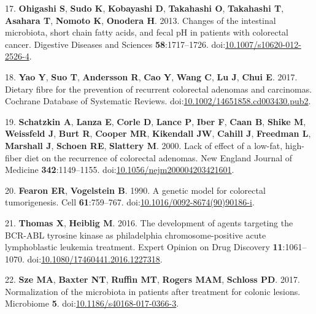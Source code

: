 \documentclass[11pt,]{article}
\begin{document}
\hypertarget{ref-Ohigashi2013}{}
17. \textbf{Ohigashi S}, \textbf{Sudo K}, \textbf{Kobayashi D},
\textbf{Takahashi O}, \textbf{Takahashi T}, \textbf{Asahara T},
\textbf{Nomoto K}, \textbf{Onodera H}. 2013. Changes of the intestinal
microbiota, short chain fatty acids, and fecal pH in patients with
colorectal cancer. Digestive Diseases and Sciences
\textbf{58}:1717--1726.
doi:\href{https://doi.org/10.1007/s10620-012-2526-4}{10.1007/s10620-012-2526-4}.

\hypertarget{ref-Yao2017}{}
18. \textbf{Yao Y}, \textbf{Suo T}, \textbf{Andersson R}, \textbf{Cao
Y}, \textbf{Wang C}, \textbf{Lu J}, \textbf{Chui E}. 2017. Dietary fibre
for the prevention of recurrent colorectal adenomas and carcinomas.
Cochrane Database of Systematic Reviews.
doi:\href{https://doi.org/10.1002/14651858.cd003430.pub2}{10.1002/14651858.cd003430.pub2}.

\hypertarget{ref-Schatzkin2000}{}
19. \textbf{Schatzkin A}, \textbf{Lanza E}, \textbf{Corle D},
\textbf{Lance P}, \textbf{Iber F}, \textbf{Caan B}, \textbf{Shike M},
\textbf{Weissfeld J}, \textbf{Burt R}, \textbf{Cooper MR},
\textbf{Kikendall JW}, \textbf{Cahill J}, \textbf{Freedman L},
\textbf{Marshall J}, \textbf{Schoen RE}, \textbf{Slattery M}. 2000. Lack
of effect of a low-fat, high-fiber diet on the recurrence of colorectal
adenomas. New England Journal of Medicine \textbf{342}:1149--1155.
doi:\href{https://doi.org/10.1056/nejm200004203421601}{10.1056/nejm200004203421601}.

\hypertarget{ref-Fearon1990}{}
20. \textbf{Fearon ER}, \textbf{Vogelstein B}. 1990. A genetic model for
colorectal tumorigenesis. Cell \textbf{61}:759--767.
doi:\href{https://doi.org/10.1016/0092-8674(90)90186-i}{10.1016/0092-8674(90)90186-i}.

\hypertarget{ref-Thomas2016}{}
21. \textbf{Thomas X}, \textbf{Heiblig M}. 2016. The development of
agents targeting the BCR-ABL tyrosine kinase as philadelphia
chromosome-positive acute lymphoblastic leukemia treatment. Expert
Opinion on Drug Discovery \textbf{11}:1061--1070.
doi:\href{https://doi.org/10.1080/17460441.2016.1227318}{10.1080/17460441.2016.1227318}.

\hypertarget{ref-normalization_Sze2017}{}
22. \textbf{Sze MA}, \textbf{Baxter NT}, \textbf{Ruffin MT},
\textbf{Rogers MAM}, \textbf{Schloss PD}. 2017. Normalization of the
microbiota in patients after treatment for colonic lesions. Microbiome
\textbf{5}.
doi:\href{https://doi.org/10.1186/s40168-017-0366-3}{10.1186/s40168-017-0366-3}.
\end{document}

